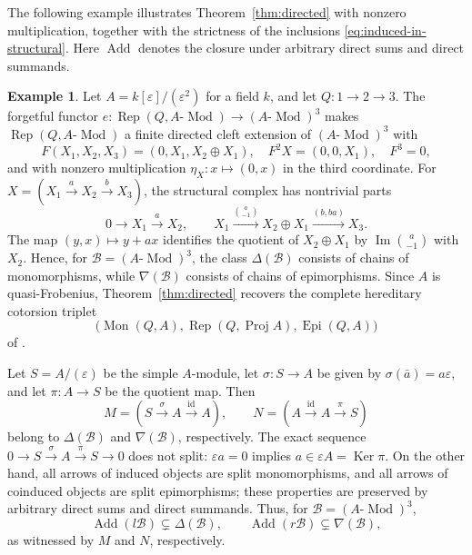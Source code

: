 \documentclass[11pt]{amsart}
\theoremstyle{definition}
\newtheorem{example}[theorem]{Example}
\theoremstyle{remark}
\theoremstyle{plain}
\numberwithin{equation}{section}
\begin{document}
The following example illustrates Theorem~\ref{thm:directed} with
nonzero multiplication, together with the strictness of the inclusions
\eqref{eq:induced-in-structural}. Here $\operatorname{Add}$ denotes the closure under
arbitrary direct sums and direct summands.

\begin{example}\label{ex:path}
Let $A = k[\varepsilon]/(\varepsilon^2)$ for a field $k$, and let
$Q: 1 \to 2 \to 3$. The forgetful functor
$e: \operatorname{Rep}(Q, A\text{-}\operatorname{Mod}) \to (A\text{-}\operatorname{Mod})^3$ makes
$\operatorname{Rep}(Q, A\text{-}\operatorname{Mod})$ a finite directed cleft extension of
$(A\text{-}\operatorname{Mod})^3$ with
\[
 F(X_1, X_2, X_3) = (0, X_1, X_2 \oplus X_1), \quad
 F^2X = (0, 0, X_1), \quad F^3 = 0,
\]
and with nonzero multiplication $\eta_X: x \mapsto (0, x)$ in the third
coordinate.
For $X = (X_1\xrightarrow aX_2\xrightarrow bX_3)$, the structural complex
has nontrivial parts
\[
 0 \to X_1\xrightarrow aX_2, \qquad
 X_1\xrightarrow{\binom a{-1}}X_2 \oplus X_1
             \xrightarrow{(b, ba)}X_3.
\]
The map $(y, x) \mapsto y+ax$ identifies the quotient of $X_2 \oplus X_1$
by $\operatorname{Im}\binom a{-1}$ with $X_2$. Hence, for
$\mathcal{B} = (A\text{-}\operatorname{Mod})^3$, the class $\Delta(\mathcal{B})$ consists of chains of monomorphisms, while $\nabla(\mathcal{B})$
consists of chains of epimorphisms. Since $A$ is quasi-Frobenius,
Theorem~\ref{thm:directed} recovers the complete hereditary cotorsion triplet
\[
 \bigl(\operatorname{Mon}(Q, A), \operatorname{Rep}(Q, \operatorname{Proj} A), \operatorname{Epi}(Q, A)\bigr)
\]
of \cite[Corollary~6.6]{EPZ}.

Let $S = A/(\varepsilon)$ be the simple $A$-module, let $\sigma: S \to A$ be
given by $\sigma(\bar a) = a\varepsilon$, and let $\pi: A \to S$ be the
quotient map. Then
\[
 M = (S\xrightarrow\sigma A\xrightarrow{\mathrm{id}}A), \qquad
 N = (A\xrightarrow{\mathrm{id}}A\xrightarrow\pi S)
\]
belong to $\Delta(\mathcal{B})$ and $\nabla(\mathcal{B})$, respectively. The exact
sequence $0 \to S\xrightarrow{\sigma}A\xrightarrow\pi S \to 0$ does not split:
$\varepsilon a = 0$ implies $a \in \varepsilon A = \operatorname{Ker}\pi$. On the other hand,
all arrows of induced objects are split monomorphisms, and all arrows of
coinduced objects are split epimorphisms; these properties are preserved by
arbitrary direct sums and direct summands. Thus, for
$\mathcal{B} = (A\text{-}\operatorname{Mod})^3$,
\[
 \operatorname{Add}(l\mathcal{B}) \subsetneq \Delta(\mathcal{B}), \qquad
 \operatorname{Add}(r\mathcal{B}) \subsetneq \nabla(\mathcal{B}),
\]
as witnessed by $M$ and $N$, respectively.
\end{example}
\end{document}
